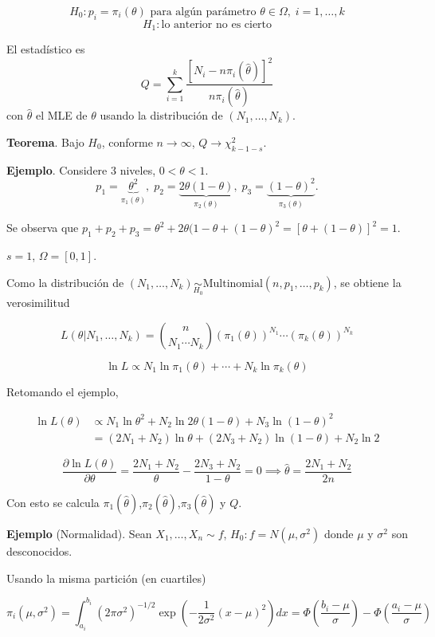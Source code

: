 \documentclass[
  12pt,
]{book}
\begin{document}
\[H_0: p_i = \pi_i(\theta)\text{ para algún parámetro }\theta\in \Omega,\;i=1,\dots,k\]
\[H_1: \text{lo anterior no es cierto}\]

El estadístico es
\[Q = \sum_{i=1}^k\dfrac{[N_i-n\pi_i(\hat\theta)]^2}{n\pi_i(\hat\theta)}\]
con \(\hat\theta\) el MLE de \(\theta\) usando la distribución de \((N_1,\dots,N_k)\).

\textbf{Teorema}. Bajo \(H_0\), conforme \(n\to \infty\), \(Q\to \chi^2_{k-1-s}\).

\textbf{Ejemplo}. Considere 3 niveles, \(0<\theta<1\).
\[p_1 = \underbrace{\theta^2}_{\pi_1(\theta)},\;p_2 = \underbrace{2\theta(1-\theta)}_{\pi_2(\theta)},\;p_3 = \underbrace{(1-\theta)^2}_{\pi_3(\theta)}.\]

Se observa que \(p_1+p_2+p_3 = \theta^2 + 2\theta (1-\theta +(1-\theta)^2 =[\theta+(1-\theta)]^2 = 1\).

\(s = 1\), \(\Omega = [0,1]\).

Como la distribución de \((N_1,\dots,N_k)\underset{H_0}{\sim} \text{Multinomial}(n,p_1,\dots,p_k)\), se obtiene la verosimilitud

\[L (\theta|N_1,\dots,N_k) = {n \choose {N_1\cdots N_k}}(\pi_1(\theta))^{N_1}\cdots(\pi_k(\theta))^{N_k}\]

\[\ln L \propto N_1\ln\pi_1(\theta)+\cdots+N_k\ln\pi_k(\theta)\]

Retomando el ejemplo,

\begin{align*}
\ln L(\theta) & \propto N_1\ln \theta^2 + N_2 \ln 2\theta(1-\theta) + N_3\ln (1-\theta)^2\\
& = (2N_1+N_2)\ln \theta + (2N_3+N_2)\ln(1-\theta) + N_2\ln 2
\end{align*}

\[\dfrac{\partial \ln L(\theta)}{\partial\theta} = \dfrac{2N_1+N_2}{\theta}-\dfrac{2N_3+N_2}{1-\theta} = 0 \implies \hat\theta = \dfrac{2N_1+N_2}{2n}\]

Con esto se calcula \(\pi_1(\hat \theta)\),\(\pi_2(\hat \theta)\),\(\pi_3(\hat \theta)\) y \(Q\).

\textbf{Ejemplo} (Normalidad). Sean \(X_1,\dots,X_n\sim f\), \(H_0: f = N(\mu,\sigma^2)\) donde \(\mu\) y \(\sigma^2\) son desconocidos.

Usando la misma partición (en cuartiles)

\[\pi_i(\mu,\sigma^2) = \int_{a_i}^{b_i}(2\pi\sigma^2)^{-1/2}\exp\left(-\dfrac 1{2\sigma^2}(x-\mu)^2\right)dx = \Phi\left(\dfrac{b_i-\mu}{\sigma}\right)-\Phi\left(\dfrac{a_i-\mu}{\sigma}\right)\]
\end{document}
